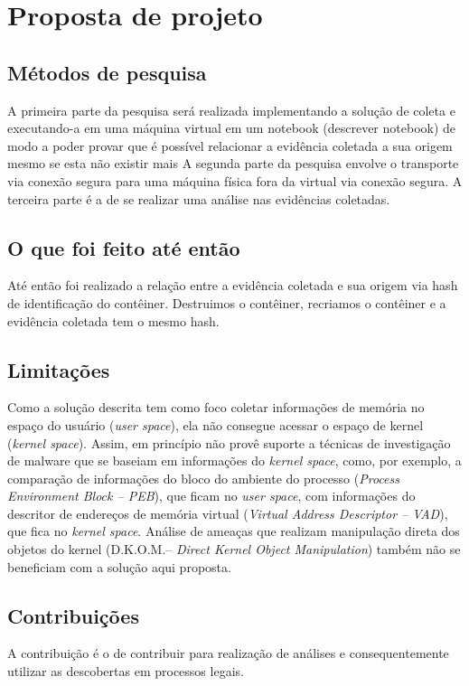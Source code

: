 \chapter{Proposta de projeto}

\section{Métodos de pesquisa}

A primeira parte da pesquisa será realizada implementando a solução de coleta e executando-a em uma máquina virtual em um notebook (descrever notebook) de modo a poder provar que é possível relacionar a evidência coletada a sua origem mesmo se esta não existir mais
%
A segunda parte da pesquisa envolve o transporte via conexão segura para uma máquina física fora da virtual via conexão segura.
%
A terceira parte é a de se realizar uma análise nas evidências coletadas.

\section{O que foi feito até então}

Até então foi realizado a relação entre a evidência coletada e sua origem via hash de identificação do contêiner. Destruimos o contêiner, recriamos o contêiner e a evidência coletada tem o mesmo hash.

\section{Limitações}

Como a solução descrita tem como foco coletar informações de memória no espaço do usuário (\textit{user space}), ela não consegue acessar o espaço de kernel (\textit{kernel space}). 
%
Assim, \fancyname em princípio não provê suporte a técnicas de investigação de malware que se baseiam em informações do \textit{kernel space}, como, por exemplo, a comparação de informações do bloco do ambiente do processo (\textit{Process Environment Block -- PEB}), que ficam no \textit{user space}, com informações do descritor de endereços de memória virtual (\textit{Virtual Address Descriptor -- VAD}), que fica no \textit{kernel space}. 
%
Análise de ameaças que realizam manipulação direta dos objetos do kernel (D.K.O.M.-- \textit{Direct Kernel Object Manipulation}) também não se beneficiam com a solução aqui proposta. 

\section{Contribuições}

A contribuição é o de contribuir para realização de análises e consequentemente utilizar as descobertas em processos legais.

